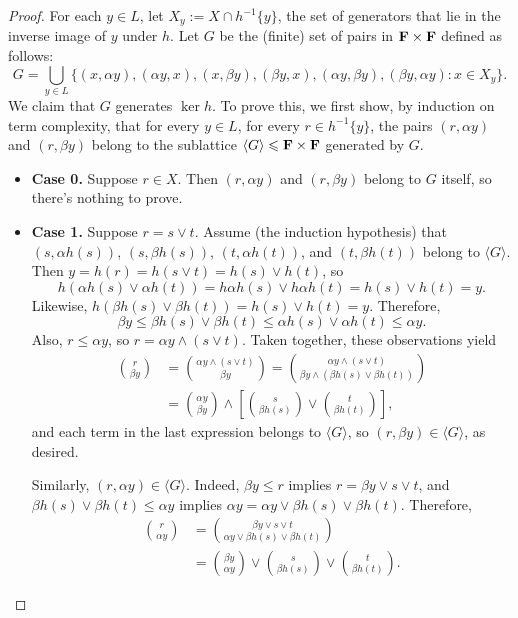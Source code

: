 \begin{proof}
For each $y \in L$, let $X_y := X\cap h^{-1}\{y\}$, the set of generators 
that lie in the inverse image of $y$ under $h$.
Let $G$ be the (finite) set of pairs in $\mathbf{F} \times \mathbf{F}$ defined 
as follows:
\[
G = \bigcup_{y \in L}\{(x, \alpha y), (\alpha y, x), (x, \beta y), 
                       (\beta y, x), (\alpha y, \beta y), 
                       (\beta y, \alpha y) : x \in X_y\}.
\]
We claim that $G$ generates $\ker h$.  To prove this, we first show, by 
induction on term complexity, that for every $y \in L$, for every 
$r \in h^{-1}\{y\}$, the pairs $(r,\alpha y)$ and $(r,\beta y)$ belong 
to the sublattice $\langle G \rangle \leqslant \mathbf{F} \times \mathbf{F}$ 
generated by $G$.

\begin{itemize}
  \item {\bf Case 0.} Suppose $r \in X$. Then $(r,\alpha y)$ and $(r,\beta y)$ 
  belong to $G$ itself, so there's nothing to prove.  

  \item {\bf Case 1.} Suppose $r = s \vee t$. Assume (the induction hypothesis) 
  that $(s, \alpha {h(s)})$, $(s, \beta{h(s)})$, $(t, \alpha {h(t)})$, and 
  $(t, \beta{h(t)})$ belong to $\langle G \rangle$. Then 
  $y = h (r) = h(s\vee t) = h (s)\vee h(t)$, so 
  \[
  h(\alpha {h(s)} \vee \alpha {h(t)})= h\alpha h(s) \vee h\alpha h(t)=
  h(s) \vee h(t) = y.
  \]
  Likewise, $h(\beta{h(s)} \vee \beta {h(t)})= h(s) \vee h(t) = y$.
  Therefore, 
  \[
  \beta y \leqslant \beta h(s) \vee \beta h(t) \leqslant \alpha {h(s)} 
  \vee \alpha {h(t)} \leqslant \alpha y.
  \]
  Also, $r \leqslant \alpha y$, so $r = \alpha y \wedge (s\vee t)$.  Taken 
  together, these observations yield
  \begin{align}
\binom{r}{\beta y}
    &=
      \binom{\alpha y \wedge (s\vee t)}{
              \beta y}
= \binom{\alpha y \wedge (s\vee t)}{
            \beta y \wedge (\beta {h(s)} \vee \beta {h(t)}) 
        }
      \nonumber\\
    &=\binom{\alpha y}{\beta y} \wedge 
      \left[\binom{s}{\beta {h(s)}} \vee \binom{t}{ \beta {h(t)} } \right], \nonumber
  \end{align}
  and each term in the last expression belongs to $\langle G \rangle$, 
  so $(r, \beta y) \in \langle G \rangle$, as desired.

Similarly, $(r, \alpha y) \in \langle G \rangle$.  Indeed, $\beta y \leqslant r$ 
implies $r = \beta y \vee s\vee t$, and 
$\beta {h(s)} \vee \beta {h(t)} \leqslant \alpha y$ implies 
$\alpha y = \alpha y \vee \beta {h(s)} \vee \beta {h(t)}$. Therefore,
\begin{align*}
  \binom{r}{\alpha y}
  &=\binom{\beta y \vee s\vee t}{ \alpha y \vee \beta h(s) \vee \beta {h(t)} }\\
  &=\binom{\beta y}{\alpha y}
 \vee \binom{s}{\beta {h(s)}} \vee 
    \binom{t}{\beta {h(t)} }.
\end{align*}


\end{itemize}
\end{proof}
